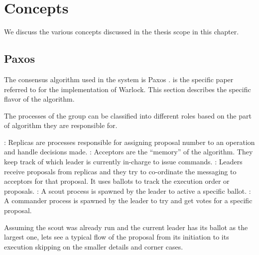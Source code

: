 \chapter{Concepts}
\label{chapter:concepts}

We discuss the various concepts discussed in the thesis scope in this chapter.

\section{Paxos}
\label{concepts.paxos}

The consensus algorithm used in the system is Paxos .
\citet{Robbert2011} is the specific paper referred to for the implementation of
Warlock. This section describes the specific flavor of the algorithm.

The processes of the group can be classified into different roles based on the
part of algorithm they are responsible for.

\begin{itemize}
    : Replicas are processes responsible for assigning proposal
    number to an operation and handle decisions made.
    : Acceptors are the ``memory'' of the algorithm. They keep
    track of which leader is currently in-charge to issue commands.
    : Leaders receive proposals from replicas and they try to
    co-ordinate the messaging to acceptors for that proposal. It uses ballots%
    to track the execution order or proposals.
    : A scout process is spawned by the leader to active a specific
    ballot.
    : A commander process is spawned by the leader to try
    and get votes for a specific proposal.
\end{itemize}

Assuming the scout was already run and the current leader has its ballot as the
largest one, lets see a typical flow of the proposal from its initiation to its
execution skipping on the smaller details and corner cases.

